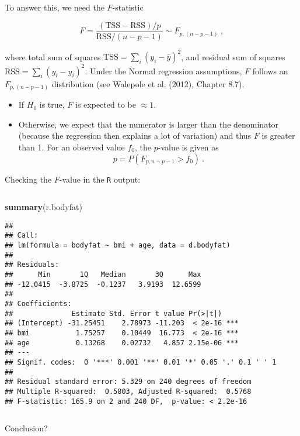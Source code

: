 \documentclass[10pt,ignorenonframetext,]{beamer}
\newenvironment{Shaded}{\begin{snugshade}}{\end{snugshade}}
\newcommand{\KeywordTok}[1]{\textcolor[rgb]{0.13,0.29,0.53}{\textbf{#1}}}
\newcommand{\NormalTok}[1]{#1}
\begin{document}
\begin{frame}

\vspace{4mm}

To answer this, we need the \(F\)-statistic

\[F = \frac{(\text{TSS}-\text{RSS})/p}{\text{RSS}/(n-p-1)} \sim F_{p,(n-p-1)}\ ,\]

where total sum of squares \(\text{TSS}=\sum_i(y_i-\bar{y})^2\), and
residual sum of squares \(\text{RSS}=\sum_i(y_i-\hat{y}_i)^2\). Under
the Normal regression assumptions, \(F\) follows an \(F_{p,(n-p-1)}\)
distribution (see Walepole et al. (2012), Chapter 8.7).

\begin{itemize}
\item
  If \(H_0\) is true, \(F\) is expected to be \(\approx 1\).
\item
  Otherwise, we expect that the numerator is larger than the denominator
  (because the regression then explains a lot of variation) and thus
  \(F\) is greater than 1. For an observed value \(f_0\), the
  \(p\)-value is given as \[p =P(F_{p,n-p-1}> f_0) \ .\]
\end{itemize}

\end{frame}

\begin{frame}[fragile]

Checking the \(F\)-value in the \texttt{R} output:

\(~\)

\scriptsize

\begin{Shaded}
\begin{Highlighting}[]
\KeywordTok{summary}\NormalTok{(r.bodyfat)}
\end{Highlighting}
\end{Shaded}

\begin{verbatim}
## 
## Call:
## lm(formula = bodyfat ~ bmi + age, data = d.bodyfat)
## 
## Residuals:
##      Min       1Q   Median       3Q      Max 
## -12.0415  -3.8725  -0.1237   3.9193  12.6599 
## 
## Coefficients:
##              Estimate Std. Error t value Pr(>|t|)    
## (Intercept) -31.25451    2.78973 -11.203  < 2e-16 ***
## bmi           1.75257    0.10449  16.773  < 2e-16 ***
## age           0.13268    0.02732   4.857 2.15e-06 ***
## ---
## Signif. codes:  0 '***' 0.001 '**' 0.01 '*' 0.05 '.' 0.1 ' ' 1
## 
## Residual standard error: 5.329 on 240 degrees of freedom
## Multiple R-squared:  0.5803, Adjusted R-squared:  0.5768 
## F-statistic: 165.9 on 2 and 240 DF,  p-value: < 2.2e-16
\end{verbatim}

\(~\)

\normalsize

Conclusion?

\end{frame}
\end{document}

